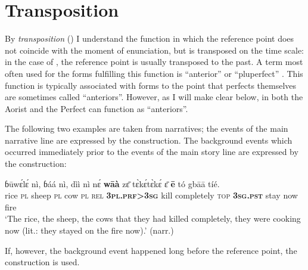 \documentclass[output=paper,newtxmath,modfonts,nonflat,hidelinks]{langsci/langscibook}
\begin{document}
\section{Transposition}
\label{khachs5}
By \textit{transposition} (\citealt[217-223]{khachhanks1990}) I understand the function in which the reference point does not coincide with the moment of enunciation, but is transposed on the time scale: in the case of , the reference point is usually transposed to the past. A term most often used for the forms fulfilling this function is ``anterior'' \citep{khachbybee1994} or ``pluperfect'' \citep{khachsich2013}. This function is typically associated with  forms \citep{khachklein1992, khachklein1994} to the point that perfects themselves are sometimes called ``anteriors''. However, as I will make clear below, in  both the Aorist and the Perfect can function as ``anteriors''.

The following two examples are taken from narratives; the events of the main narrative line are expressed by the  construction. The background events which occurred immediately prior to the events of the main story line are expressed by the  construction:

\begin{exe} \ex
\gll	ɓūwɛ́lɛ́	nì,	ɓáá	nì,	dìì	nì	nɛ́	\textbf{wāà}	zɛ̄ tɛ̀kɛ́tɛ̀kɛ́	ɛ̄	\textbf{ē}	tó	gbāā	tíé.\\
	rice	\textsc{pl}	sheep	\textsc{pl}	cow	\textsc{pl}	\textsc{rel}	\textbf{3\textsc{pl}.\textsc{prf}>3\textsc{sg}}	kill completely	\textsc{top}	\textbf{3\textsc{sg}.\textsc{pst}}	stay	now	fire	\\	
\glt ‘The rice, the sheep, the cows that they had killed completely, they were cooking now (lit.: they stayed on the fire now).’ (narr.)
\end{exe}


If, however, the background event happened long before the reference point, the  construction is used.
\end{document}
